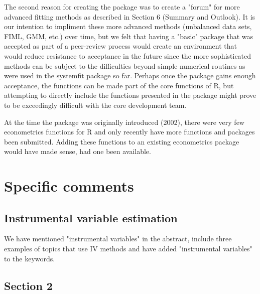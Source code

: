 \documentclass[12pt,english]{scrartcl}
\begin{document}
The second reason for creating the package was to create a "forum" for
more advanced fitting methods as described in Section 6 (Summary and
Outlook). It is our intention to impliment these more advanced methods
(unbalanced data sets, FIML, GMM, etc.) over time, but we felt that
having a "basic" package that was accepted as part of a peer-review
process would create an environment that would reduce resistance to
acceptance in the future since the more sophisticated methods can be
subject to the difficulties beyond simple numerical routines as were
used in the systemfit package so far.  Perhaps once the package gains
enough acceptance, the functions can be made part of the core
functions of R, but attempting to directly include the functions
presented in the package might prove to be exceedingly difficult with
the core development team.

At the time the package was originally introduced (2002), there were
very few econometrics functions for R and only recently have more
functions and packages been submitted. Adding these functions to an
existing econometrics package would have made sense, had one been
available. 

\section{Specific comments}

\subsection{Instrumental variable estimation}

We have mentioned "instrumental variables" in the abstract, include
three examples of topics that use IV methods and have added
"instrumental variables" to the keywords.

\subsection{Section 2}
\end{document}

